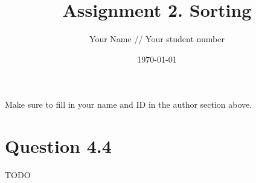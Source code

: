 \documentclass{article}
\title{Assignment 2. Sorting}
\author{Your Name // Your student number}
\date{\today}
\begin{document}
\maketitle
Make sure to fill in your name and ID in the author section above.

\section*{Question 4.4}

TODO
\end{document}
